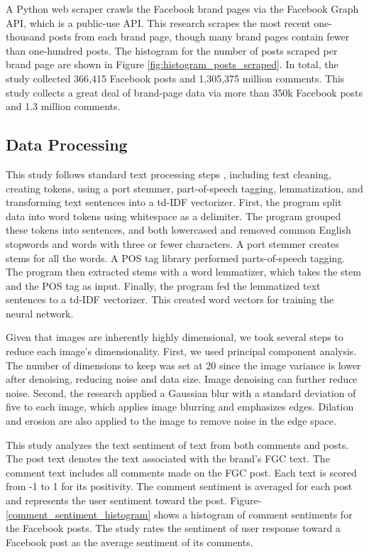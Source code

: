 \documentclass[mksc,blindrev]{informs3} %
\begin{document}
A Python web scraper crawls the Facebook brand pages via the Facebook Graph API, which is a public-use API. This research scrapes the most recent one-thousand posts from each brand page, though many brand pages contain fewer than one-hundred posts. The histogram for the number of posts scraped per brand page are shown in Figure \ref{fig:histogram_posts_scraped}. In total, the study collected 366,415 Facebook posts and 1,305,375 million comments. This study collects a great deal of brand-page data via more than 350k Facebook posts and 1.3 million comments.

\subsection{Data Processing}

This study follows standard text processing steps \cite{Camacho-Collados2019}, including text cleaning, creating tokens, using a port stemmer, part-of-speech tagging, lemmatization, and transforming text sentences into a td-IDF vectorizer. First, the program split data into word tokens using whitespace as a delimiter. The program grouped these tokens into sentences, and both lowercased and removed common English stopwords and words with three or fewer characters. A port stemmer creates stems for all the words. A POS tag library performed parts-of-speech tagging. The program then extracted stems with a word lemmatizer, which takes the stem and the POS tag as input. Finally, the program fed the lemmatized text sentences to a td-IDF vectorizer. This created word vectors for training the neural network.

Given that images are inherently highly dimensional, we took several steps to reduce each image's dimensionality. First, we used principal component analysis. The number of dimensions to keep was set at 20 since the image variance is lower after denoising, reducing noise and data size. Image denoising can further reduce noise. Second, the research applied a Gaussian blur with a standard deviation of five to each image, which applies image blurring and emphasizes edges. Dilation and erosion are also applied to the image to remove noise in the edge space.

This study analyzes the text sentiment of text from both comments and posts. The post text denotes the text associated with the brand's FGC text. The comment text includes all comments made on the FGC post. Each text is scored from -1 to 1 for its positivity. The comment sentiment is averaged for each post and represents the user sentiment toward the post. Figure-\ref{comment_sentiment_histogram} shows a histogram of comment sentiments for the Facebook posts. The study rates the sentiment of user response toward a Facebook post as the average sentiment of its comments.
\end{document}
